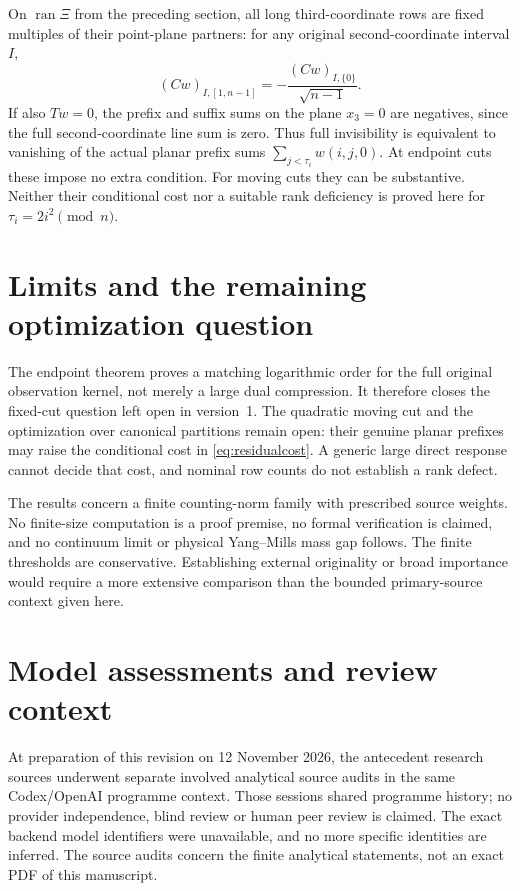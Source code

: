 \documentclass[11pt]{article}
\DeclareMathOperator{\ran}{ran}
\theoremstyle{definition}
\theoremstyle{remark}
\begin{document}
On $\ran\Xi$ from the preceding section, all long third-coordinate rows
are fixed multiples of their point-plane partners: for any original
second-coordinate interval $I$,
\[
 (Cw)_{I,[1,n-1]}=-\frac{(Cw)_{I,\{0\}}}{\sqrt{n-1}}.
\]
If also $Tw=0$, the prefix and suffix sums on the plane $x_3=0$ are
negatives, since the full second-coordinate line sum is zero. Thus full
invisibility is equivalent to vanishing of the actual planar prefix
sums $\sum_{j<\tau_i}w(i,j,0)$. At endpoint cuts these impose no extra
condition. For moving cuts they can be substantive. Neither their
conditional cost nor a suitable rank deficiency is proved here for
$\tau_i=2i^2\pmod n$.

\section{Limits and the remaining optimization question}\label{sec:limits}
The endpoint theorem proves a matching logarithmic order for the full
original observation kernel, not merely a large dual compression. It
therefore closes the fixed-cut question left open in version~1. The
quadratic moving cut and the optimization over canonical partitions remain
open: their genuine planar prefixes may raise the conditional cost in
\eqref{eq:residualcost}. A generic large direct response cannot decide that
cost, and nominal row counts do not establish a rank defect.

The results concern a finite counting-norm family with prescribed source
weights. No finite-size computation is a proof premise, no formal
verification is claimed, and no continuum limit or physical Yang--Mills
mass gap follows. The finite thresholds are conservative. Establishing
external originality or broad importance would require a more extensive
comparison than the bounded primary-source context given here.
\section*{Model assessments and review context}
At preparation of this revision on 12 November 2026, the
antecedent research sources underwent separate involved analytical source
audits in the same Codex/OpenAI programme context. Those sessions shared
programme history; no provider independence, blind review or human peer
review is claimed. The exact backend model identifiers were unavailable,
and no more specific identities are inferred. The source audits concern
the finite analytical statements, not an exact PDF of this manuscript.
\end{document}
